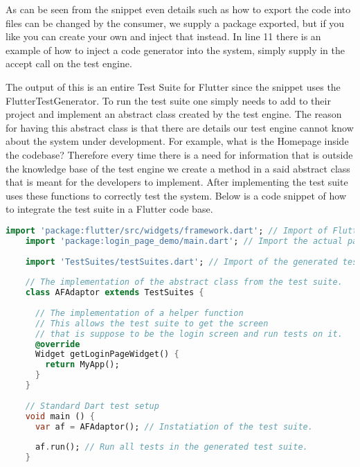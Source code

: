 As can be seen from the snippet even details such as how to export the code into files can be changed by the consumer, we supply a package exported, but if you like you can create your own and inject that instead. 
In line 11 there is an example of how to inject a code generator into the system, simply supply in the accept call on the test engine.

The output of this is an entire Test Suite for Flutter since the snippet uses the FlutterTestGenerator. 
To run the test suite one simply needs to add to their project and implement an abstract class created by the test engine. 
The reason for having this abstract class is that there are details our test engine cannot know about the system under development.
For example, what is the Homepage inside the codebase?
Therefore every time there is a need for information that is outside the knowledge base of the test engine we create a method in a said abstract class that is meant for the developers to implement. 
After implementing the test suite uses these functions to correctly test the system.
Below is a code snippet of how to integrate the test suite in a Flutter code base.

\begin{lstlisting}[language=dart]
    import 'package:flutter/src/widgets/framework.dart'; // Import of Flutter widgets
    import 'package:login_page_demo/main.dart'; // Import the actual page that should be tested
    
    import 'TestSuites/testSuites.dart'; // Import of the generated test suite.
    
    // The implementation of the abstract class from the test suite.
    class AFAdaptor extends TestSuites {
      
      // The implementation of a helper function
      // This allows the test suite to get the screen 
      // that is suppose to be the login screen and run tests on it.
      @override
      Widget getLoginPageWidget() {
        return MyApp();
      }
    }
    
    // Standard Dart test setup
    void main () {
      var af = AFAdaptor(); // Instatiation of the test suite.
    
      af.run(); // Run all tests in the generated test suite.
    }
\end{lstlisting}